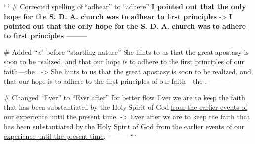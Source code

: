 ```
# Corrected spelling of “adhear” to “adhere”
\textbf{I pointed out that the only hope for the S. D. A. church was to \underline{adhear to first principles}}
->
\textbf{I pointed out that the only hope for the S. D. A. church was to \underline{adhere to first principles}}
---------

# Added “a” before “startling nature”
She hints to us that the great apostasy is soon to be realized, and that our hope is to adhere to the first principles of our faith—the .
->
She hints to us that the great apostasy is soon to be realized, and that our hope is to adhere to the first principles of our faith—the .
---------

# Changed “Ever” to “Ever after” for better flow
\underline{Ever} we are to keep the faith that has been substantiated by the Holy Spirit of God \underline{from the earlier events of our experience until the present time}.
->
\underline{Ever after} we are to keep the faith that has been substantiated by the Holy Spirit of God \underline{from the earlier events of our experience until the present time}.
---------
```
